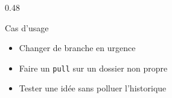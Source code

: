 \documentclass[
	11pt,
	aspectratio=169
]{beamer}
\begin{document}
\begin{frame}[fragile]
\begin{columns}[t]
        \begin{column}{0.48\textwidth}
            \begin{exampleblock}{\footnotesize Cas d'usage}
                \scriptsize
                \begin{itemize}
                    \item Changer de branche en urgence
                    \item Faire un \texttt{pull} sur un dossier non propre
                    \item Tester une idée sans polluer l'historique
                \end{itemize}
            \end{exampleblock}
        \end{column}
    \end{columns}
\end{frame}
\end{document}
